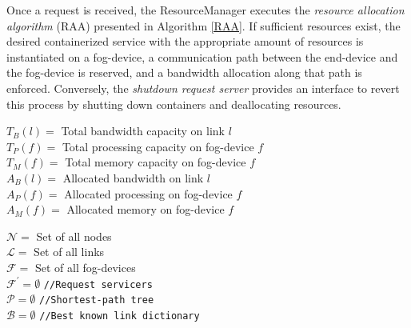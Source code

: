 Once a request is received, the ResourceManager executes the \textit{resource allocation algorithm} (RAA) presented in Algorithm \ref{RAA}.
If sufficient resources exist, the desired containerized service with the appropriate amount of resources is instantiated on a fog-device, a communication path between the end-device and the fog-device is reserved, and a bandwidth allocation along that path is enforced.
Conversely, the \textit{shutdown request server} provides an interface to revert this process by shutting down containers and deallocating resources.



\SetEndCharOfAlgoLine{}
\begin{algorithm}[!ht]
\scriptsize
{}

\BlankLine

%
\BlankLine
\BlankLine
$T_{B}(l) = $ Total bandwidth capacity on link $l$ \label{band_all_def_start}\\
$T_{P}(f) =$ Total processing capacity on fog-device $f$\\
$T_{M}(f) =$ Total memory capacity on fog-device $f$\\

\BlankLine
$A_{B}(l) = $ Allocated bandwidth on link $l$\\
$A_{P}(f) =$ Allocated processing on fog-device $f$\\
$A_{M}(f) =$ Allocated memory on fog-device $f$ \label{band_all_def_end} \\

\BlankLine

$\mathcal{N} = $ Set of all nodes \\
$\mathcal{L} = $ Set of all links \\
$\mathcal{F} = $ Set of all fog-devices \\
$\mathcal{F}^{\prime} = \emptyset$ \texttt{//Request servicers} \\
$\mathcal{P} = \emptyset$ \texttt{//Shortest-path tree} \\
$\mathcal{B} = \emptyset$ \texttt{//Best known link dictionary} \\



\end{algorithm}
